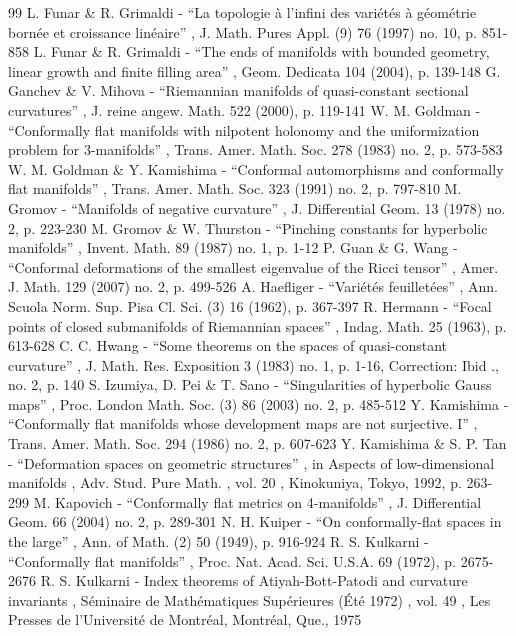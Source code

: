 \begin{thebibliography}{99}
 L. Funar \& R. Grimaldi - “La topologie à l’infini des variétés à géométrie bornée et croissance linéaire” , J. Math. Pures Appl. (9) 76 (1997) no. 10, p. 851-858
 L. Funar \& R. Grimaldi - “The ends of manifolds with bounded geometry, linear growth and finite filling area” , Geom. Dedicata 104 (2004), p. 139-148
 G. Ganchev \& V. Mihova - “Riemannian manifolds of quasi-constant sectional curvatures” , J. reine angew. Math. 522 (2000), p. 119-141
 W. M. Goldman - “Conformally flat manifolds with nilpotent holonomy and the uniformization problem for $3$-manifolds” , Trans. Amer. Math. Soc. 278 (1983) no. 2, p. 573-583
 W. M. Goldman \& Y. Kamishima - “Conformal automorphisms and conformally flat manifolds” , Trans. Amer. Math. Soc. 323 (1991) no. 2, p. 797-810
 M. Gromov - “Manifolds of negative curvature” , J. Differential Geom. 13 (1978) no. 2, p. 223-230
 M. Gromov \& W. Thurston - “Pinching constants for hyperbolic manifolds” , Invent. Math. 89 (1987) no. 1, p. 1-12
 P. Guan \& G. Wang - “Conformal deformations of the smallest eigenvalue of the Ricci tensor” , Amer. J. Math. 129 (2007) no. 2, p. 499-526
 A. Haefliger - “Variétés feuilletées” , Ann. Scuola Norm. Sup. Pisa Cl. Sci. (3) 16 (1962), p. 367-397
 R. Hermann - “Focal points of closed submanifolds of Riemannian spaces” , Indag. Math. 25 (1963), p. 613-628
 C. C. Hwang - “Some theorems on the spaces of quasi-constant curvature” , J. Math. Res. Exposition 3 (1983) no. 1, p. 1-16, Correction: Ibid ., no. 2, p. 140
 S. Izumiya, D. Pei \& T. Sano - “Singularities of hyperbolic Gauss maps” , Proc. London Math. Soc. (3) 86 (2003) no. 2, p. 485-512
 Y. Kamishima - “Conformally flat manifolds whose development maps are not surjective. I” , Trans. Amer. Math. Soc. 294 (1986) no. 2, p. 607-623
 Y. Kamishima \& S. P. Tan - “Deformation spaces on geometric structures” , in Aspects of low-dimensional manifolds , Adv. Stud. Pure Math. , vol. 20 , Kinokuniya, Tokyo, 1992, p. 263-299
 M. Kapovich - “Conformally flat metrics on 4-manifolds” , J. Differential Geom. 66 (2004) no. 2, p. 289-301
 N. H. Kuiper - “On conformally-flat spaces in the large” , Ann. of Math. (2) 50 (1949), p. 916-924
 R. S. Kulkarni - “Conformally flat manifolds” , Proc. Nat. Acad. Sci. U.S.A. 69 (1972), p. 2675-2676
 R. S. Kulkarni - Index theorems of Atiyah-Bott-Patodi and curvature invariants , Séminaire de Mathématiques Supérieures (Été 1972) , vol. 49 , Les Presses de l’Université de Montréal, Montréal, Que., 1975

\end{thebibliography}
